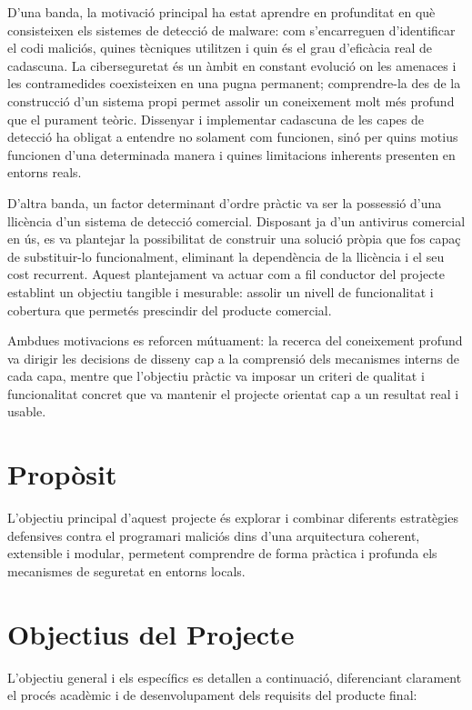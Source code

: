 \documentclass[12pt,a4paper]{report}
\begin{document}
D'una banda, la motivació principal ha estat aprendre en profunditat en què consisteixen els sistemes de detecció de malware: com s'encarreguen d'identificar el codi maliciós, quines tècniques utilitzen i quin és el grau d'eficàcia real de cadascuna. La ciberseguretat és un àmbit en constant evolució on les amenaces i les contramedides coexisteixen en una pugna permanent; comprendre-la des de la construcció d'un sistema propi permet assolir un coneixement molt més profund que el purament teòric. Dissenyar i implementar cadascuna de les capes de detecció ha obligat a entendre no solament com funcionen, sinó per quins motius funcionen d'una determinada manera i quines limitacions inherents presenten en entorns reals.

D'altra banda, un factor determinant d'ordre pràctic va ser la possessió d'una llicència d'un sistema de detecció comercial. Disposant ja d'un antivirus comercial en ús, es va plantejar la possibilitat de construir una solució pròpia que fos capaç de substituir-lo funcionalment, eliminant la dependència de la llicència i el seu cost recurrent. Aquest plantejament va actuar com a fil conductor del projecte establint un objectiu tangible i mesurable: assolir un nivell de funcionalitat i cobertura que permetés prescindir del producte comercial.

Ambdues motivacions es reforcen mútuament: la recerca del coneixement profund va dirigir les decisions de disseny cap a la comprensió dels mecanismes interns de cada capa, mentre que l'objectiu pràctic va imposar un criteri de qualitat i funcionalitat concret que va mantenir el projecte orientat cap a un resultat real i usable.

\section{Propòsit}
L'objectiu principal d'aquest projecte és explorar i combinar diferents estratègies defensives contra el programari maliciós dins d'una arquitectura coherent, extensible i modular, permetent comprendre de forma pràctica i profunda els mecanismes de seguretat en entorns locals.

\section{Objectius del Projecte}
L'objectiu general i els específics es detallen a continuació, diferenciant clarament el procés acadèmic i de desenvolupament dels requisits del producte final:
\end{document}
